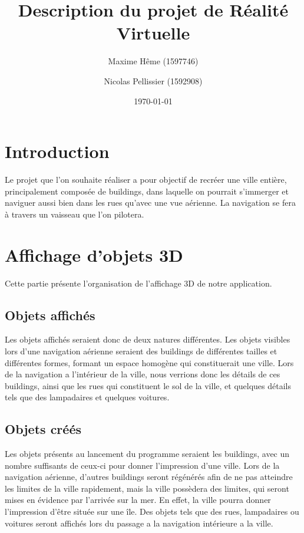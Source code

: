 \documentclass[a4paper,12pt]{article}
\title{Description du projet de Réalité Virtuelle}
\date{\today}
\author{Maxime Hême (1597746)  \and Nicolas Pellissier (1592908)}
\begin{document}
\maketitle
\section*{Introduction}
Le projet que l'on souhaite réaliser a pour objectif de recréer une ville entière, principalement composée de buildings, dans laquelle on pourrait s'immerger et naviguer aussi bien dans les rues qu'avec une vue aérienne. La navigation se fera à travers un vaisseau que l'on pilotera.

\section {Affichage d'objets 3D}

Cette partie présente l'organisation de l'affichage 3D de notre application.
\subsection{Objets affichés}
Les objets affichés seraient donc de deux natures différentes. Les objets visibles lors d'une navigation aérienne seraient des buildings de différentes tailles et différentes formes, formant un espace homogène qui constituerait une ville.
Lors de la navigation a l'intérieur de la ville, nous verrions donc les détails de ces buildings, ainsi que les rues qui constituent le sol de la ville, et quelques détails tels que des lampadaires et quelques voitures. 

\subsection{Objets créés}
Les objets présents au lancement du programme seraient les buildings, avec un nombre suffisants de ceux-ci pour donner l'impression d'une ville. 
Lors de la navigation aérienne, d'autres buildings seront régénérés afin de ne pas atteindre les limites de la ville rapidement, mais la ville possèdera des limites, qui seront mises en évidence par l'arrivée sur la mer. En effet, la ville pourra donner l'impression d'être située sur une île.
Des objets tels que des rues, lampadaires ou voitures seront affichés lors du passage a la navigation intérieure a la ville.
\end{document}
